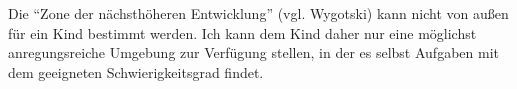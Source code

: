 Die ``Zone der nächsthöheren Entwicklung'' (vgl. Wygotski) kann nicht von außen für ein Kind bestimmt werden.
Ich kann dem Kind daher nur eine möglichst anregungsreiche Umgebung zur Verfügung stellen, in der es selbst Aufgaben mit dem geeigneten Schwierigkeitsgrad findet.